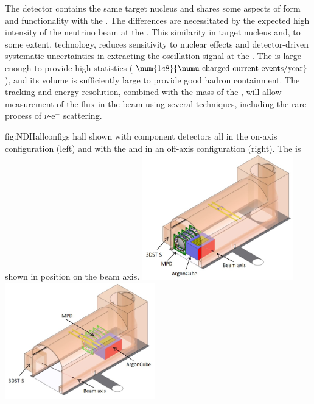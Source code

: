The  detector contains the same target nucleus and shares some aspects of form and functionality with the . The differences are necessitated by the expected high intensity of the neutrino beam at the .  This similarity in target nucleus and, to some extent, technology, reduces sensitivity to nuclear effects and detector-driven systematic uncertainties in extracting the oscillation signal at the  . 
The  is large enough to provide high statistics ($\num{1e8}{\numu \text{ charged current events/year}}$), and its volume is sufficiently large to provide good hadron containment.  The tracking and energy resolution, combined with the mass of the , will allow measurement of the flux in the beam using several techniques, including the rare process of $\nu$-e$^{-}$ scattering.

\begin{dunefigure}
{fig:NDHallconfigs}
{  hall shown with component detectors all in the on-axis configuration (left) and with the  and  in an off-axis configuration (right). The  is shown in position on the beam axis. 
}
\includegraphics[width=0.49\textwidth]{graphics/NDHall_onaxis.jpg}
\includegraphics[width=0.49\textwidth]{graphics/NDHall_offaxis.jpg}
\end{dunefigure}

